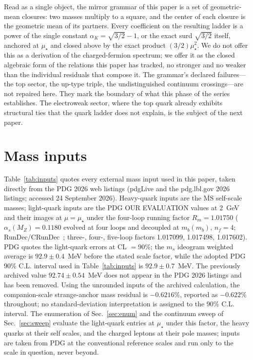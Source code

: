 \documentclass[aps,twocolumn,superscriptaddress,nofootinbib,floatfix]{revtex4-2}
\newcommand{\MSbar}{\overline{\mathrm{MS}}}
\newcommand{\mstar}{\mu_\star}
\newcommand{\alphaK}{\alpha_K}
\begin{document}
Read as a single object, the mirror grammar of this paper is a set of geometric-mean closures: two masses multiply to a square, and the center of each closure is the geometric mean of its partners. Every coefficient on the resulting ladder is a power of the single constant $\alphaK=\sqrt{3/2}-1$, or the exact surd $\sqrt{3/2}$ itself, anchored at $\mstar$ and closed above by the exact product $(3/2)\mstar^2$. We do not offer this as a derivation of the charged-fermion spectrum; we offer it as the closed algebraic form of the relations this paper has tracked, no stronger and no weaker than the individual residuals that compose it. The grammar's declared failures---the top sector, the up-type triple, the undistinguished continuum crossings---are not repaired here. They mark the boundary of what this phase of the series establishes. The electroweak sector, where the top quark already exhibits structural ties that the quark ladder does not explain, is the subject of the next paper.

\section{Mass inputs}
\label{app:inputs}

Table~\ref{tab:inputs} quotes every external mass input used in this paper, taken directly from the PDG 2026 web listings (pdgLive and the pdg.lbl.gov 2026 listings; accessed 24 September 2026). Heavy-quark inputs are the $\MSbar$ self-scale masses; light-quark inputs are the PDG OUR EVALUATION values at $2$~GeV and their images at $\mu=\mstar$ under the four-loop running factor $R_m=1.01750$ ($\alpha_s(M_Z)=0.1180$ evolved at four loops and decoupled at $m_b(m_b)$, $n_f=4$; RunDec/CRunDec~\cite{RunDec3}; three-, four-, five-loop factors 1.017099, 1.017498, 1.017602). PDG quotes the light-quark errors at CL $=90\%$; the $m_s$ ideogram weighted average is $92.9\pm0.4$~MeV before the stated scale factor, while the adopted PDG 90\% C.L. interval used in Table~\ref{tab:inputs} is $92.9\pm0.7$~MeV. The previously archived value $92.74\pm0.54$~MeV does not appear in the PDG 2026 listings and has been removed. Using the unrounded inputs of the archived calculation, the companion-scale strange-anchor mass residual is $-0.6216\%$, reported as $-0.622\%$ throughout; no standard-deviation interpretation is assigned to the 90\% C.L. interval. The enumeration of Sec.~\ref{sec:enum} and the continuum sweep of Sec.~\ref{sec:sweep} evaluate the light-quark entries at $\mstar$ under this factor, the heavy quarks at their self scales, and the charged leptons at their pole masses; inputs are taken from PDG at the conventional reference scales and run only to the scale in question, never beyond.
\end{document}
